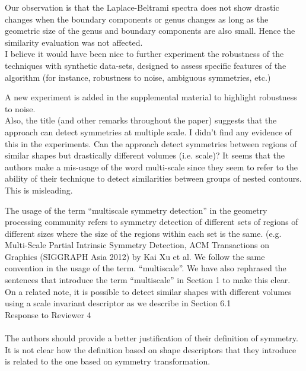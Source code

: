 \documentclass[10pt]{article}
\begin{document}
   {\color{blue}Our observation is that the Laplace-Beltrami spectra
	   does not show drastic changes when the boundary components or genus changes
	   as long as the geometric size of the genus and boundary components 
   are also small. Hence the similarity evaluation was not affected.}\\

   I believe it would have been nice to further experiment the robustness of
   the techniques with synthetic data-sets, designed to assess specific
   features of the algorithm (for instance, robustness to noise, ambiguous
   symmetries, etc.)

   {\color{blue}A new experiment is added in the supplemental material
   to highlight robustness to noise.}\\

   Also, the title (and other remarks throughout the paper) suggests that
   the approach can detect symmetries at multiple scale. I didn't find any
   evidence of this in the experiments. Can the approach detect symmetries
   between regions of similar shapes but drastically different volumes (i.e.
   scale)?
   It seems that the authors make a mis-usage of the word multi-scale since
   they seem to refer to the ability of their technique to detect
   similarities between groups of nested contours. This is misleading.

   {\color{blue}The usage of the term ``multiscale symmetry detection'' in
	   the geometry processing community refers to symmetry detection of
	   different sets of regions of different sizes where the size of the regions
	   within each set is the same. (e.g. Multi-Scale Partial Intrinsic Symmetry Detection,
   ACM Transactions on Graphics (SIGGRAPH Asia 2012) by Kai Xu et al.
   We follow the same convention in the usage of the term. ``multiscale''.
   We have also rephrased the sentences that introduce the term ``multiscale''
   in Section 1 to make this clear. On a related note, it is possible to
   detect similar shapes with different volumes using a scale invariant descriptor  as we describe in Section 6.1}\\
   

{\noindent \LARGE Response to Reviewer 4}\\\\
   The authors should provide a better justification of their definition of
   symmetry. It is not clear how the definition based on shape descriptors
   that they introduce is related to the one based on symmetry
   transformation. 
\end{document}
